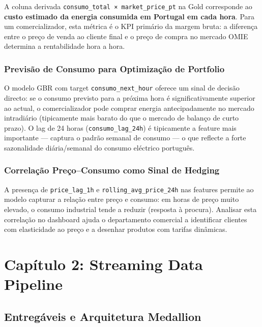 \documentclass[11pt,a4paper]{article}
\begin{document}
A coluna derivada \texttt{consumo\_total × market\_price\_pt} na Gold corresponde ao \textbf{custo estimado da energia consumida em Portugal em cada hora}. Para um comercializador, esta métrica é o KPI primário da margem bruta: a diferença entre o preço de venda ao cliente final e o preço de compra no mercado OMIE determina a rentabilidade hora a hora.

\subsubsection{Previsão de Consumo para Optimização de Portfolio}

O modelo GBR com target \texttt{consumo\_next\_hour} oferece um sinal de decisão directo: se o consumo previsto para a próxima hora é significativamente superior ao actual, o comercializador pode comprar energia antecipadamente no mercado intradiário (tipicamente mais barato do que o mercado de balanço de curto prazo). O lag de 24 horas (\texttt{consumo\_lag\_24h}) é tipicamente a feature mais importante — captura o padrão semanal de consumo — o que reflecte a forte sazonalidade diária/semanal do consumo eléctrico português.

\subsubsection{Correlação Preço--Consumo como Sinal de Hedging}

A presença de \texttt{price\_lag\_1h} e \texttt{rolling\_avg\_price\_24h} nas features permite ao modelo capturar a relação entre preço e consumo: em horas de preço muito elevado, o consumo industrial tende a reduzir (resposta à procura). Analisar esta correlação no dashboard ajuda o departamento comercial a identificar clientes com elasticidade ao preço e a desenhar produtos com tarifas dinâmicas.

\section{Capítulo 2: Streaming Data Pipeline}

\subsection{Entregáveis e Arquitetura Medallion}
\end{document}
